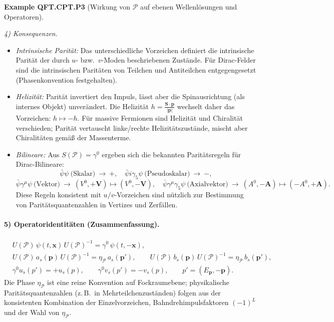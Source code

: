 \documentclass[10pt, letterpaper]{article}
\newcommand{\CustomHeading}[3]{%
  \par\medskip\noindent%
  \textbf{#1 #2} \textnormal{(#3)}.\enskip%
}
\newenvironment{EXA}[2]{\begin{unitbox}\CustomHeading{Example}{#1}{#2}}{\end{unitbox}}
\begin{document}
\begin{EXA}{QFT.CPT.P3}{Wirkung von $\mathcal P$ auf ebenen Wellenlösungen und Operatoren}
\emph{4) Konsequenzen.}
\begin{itemize}
  \item \emph{Intrinsische Parität:} Das unterschiedliche Vorzeichen definiert die intrinsische Parität der durch $u$- bzw.\ $v$-Moden beschriebenen Zustände. Für Dirac-Felder sind die intrinsischen Paritäten von Teilchen und Antiteilchen entgegengesetzt (Phasenkonvention festgehalten).
  \item \emph{Helizität:} Parität invertiert den Impuls, lässt aber die Spinausrichtung (als internes Objekt) unverändert. Die Helizität $h=\frac{\mathbf S\cdot \mathbf p}{|\mathbf p|}$ wechselt daher das Vorzeichen: $h\mapsto -h$. Für massive Fermionen sind Helizität und Chiralität verschieden; Parität vertauscht linke/rechte Helizitätszustände, mischt aber Chiralitäten gemäß der Massenterme.
  \item \emph{Bilineare:} Aus $S(\mathcal P)=\gamma^0$ ergeben sich die bekannten Paritätsregeln für Dirac-Bilineare:
  \[
    \bar\psi\psi \ \text{(Skalar)}\ \to\ +,\quad
    \bar\psi i\gamma_5\psi \ \text{(Pseudoskalar)}\ \to\ -,
  \]
  \[
    \bar\psi\gamma^\mu\psi \ \text{(Vektor)}\ \to\ (V^0,+\mathbf V)\mapsto (V^0,-\mathbf V),\quad
    \bar\psi\gamma^\mu\gamma_5\psi \ \text{(Axialvektor)}\ \to\ (A^0,-\mathbf A)\mapsto (-A^0,+\mathbf A).
  \]
  Diese Regeln konsistent mit $u/v$-Vorzeichen sind nützlich zur Bestimmung von Paritätsquantenzahlen in Vertizes und Zerfällen.
\end{itemize}

\paragraph{5) Operatoridentitäten (Zusammenfassung).}
\[
\boxed{
\begin{aligned}
&U(\mathcal P)\,\psi(t,\mathbf x)\,U(\mathcal P)^{-1}=\gamma^0\,\psi(t,-\mathbf x),\\
&U(\mathcal P)\,a_s(\mathbf p)\,U(\mathcal P)^{-1}=\eta_{\mathcal P}\,a_s(\mathbf p'),\qquad
U(\mathcal P)\,b_s(\mathbf p)\,U(\mathcal P)^{-1}=\eta_{\mathcal P}\,b_s(\mathbf p'),\\
&\gamma^0 u_s(p')=+u_s(p),\qquad \gamma^0 v_s(p')=-v_s(p),\qquad p'=(E_{\mathbf p},-\mathbf p).
\end{aligned}
}
\]
Die Phase $\eta_{\mathcal P}$ ist eine reine Konvention auf Fockraumebene; physikalische Paritätsquantenzahlen (z.\,B.\ in Mehrteilchenzuständen) folgen aus der konsistenten Kombination der Einzelvorzeichen, Bahndrehimpulsfaktoren $(-1)^L$ und der Wahl von $\eta_{\mathcal P}$.
\end{EXA}
\end{document}
